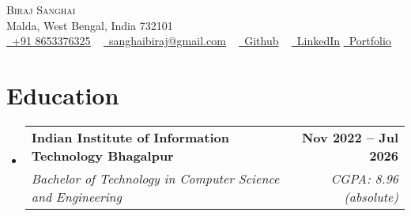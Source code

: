 \documentclass[letterpaper,11pt]{article}
\makeatletter
\newcommand{\resumeItem}[1]{
  \item\small{
    {#1 \vspace{-2pt}}
  }
}
\newcommand{\resumeSubheading}[4]{
  \vspace{-5pt}\item
    \begin{tabular*}{1.0\textwidth}[t]{l@{\extracolsep{\fill}}r}
      \textbf{#1} & \textbf{\small #2} \\
      \textit{\small#3} & \textit{\small #4} \\
    \end{tabular*}\vspace{-5pt}
}
\newcommand{\collegeItem}[1]{
    \item
    \begin{tabular*}{0.97\textwidth}{l@{\extracolsep{\fill}}r}
      \textit{\small#1} & \textit{\small } \\
    \end{tabular*}\vspace{-4pt}
}
\newcommand{\resumeSubHeadingListStart}{\begin{itemize}[leftmargin=0.0in, label={}]}
\newcommand{\resumeSubHeadingListEnd}{\end{itemize}}
\makeatother
\begin{document}

\begin{center}
    {\Huge \scshape Biraj Sanghai} \\ \vspace{1pt}
    Malda, West Bengal, India 732101 \\ \vspace{1pt}
    \href{tel:918653376325}{\color{Blue} \raisebox{-0.2\height}\faPhone\
    \underline {+91 8653376325}} ~ \href{mailto:sanghaibiraj@gmail.com}{\color{Blue} \raisebox{-0.2\height}\faEnvelope\  \underline{sanghaibiraj@gmail.com}} ~ 
    \href{https://github.com/sanghaibiraj}{\color{Blue} \raisebox{-0.2\height}\faGithub\ \underline{Github}} ~ 
    \href{https://www.linkedin.com/in/biraj-sanghai-iiitbh}{\color{Blue} \raisebox{-0.2\height}\faLinkedin\ \underline{LinkedIn}}
    \hspace{2pt}
    \href{https://biraj-sanghai.vercel.app/}{\color{Blue} 
    \raisebox{-0.2\height}\faGlobe\ \underline{Portfolio}}
    \vspace{-8pt}
\end{center}


\section{Education}
  \resumeSubHeadingListStart
  \vspace{4pt}
    \resumeSubheading
      {Indian Institute of Information Technology Bhagalpur}{Nov 2022 -- Jul 2026}
      {Bachelor of Technology in Computer Science and Engineering}{CGPA: 8.96 (absolute)}
  \resumeSubHeadingListEnd
  \vspace{-12pt}
  
\end{document}
